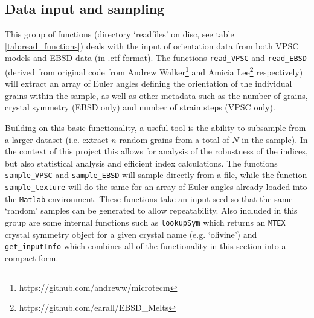 \documentclass[a4paper,12pt,twoside]{report}
\numberwithin{equation}{chapter}
\begin{document}
\subsection{Data input and sampling}

This group of functions (directory \lq{}readfiles\rq{} on disc, see table \ref{tab:read_functions}) deals with the input of orientation data from both VPSC models and EBSD data (in .ctf format). The functions \texttt{read\_{}VPSC} and \texttt{read\_{}EBSD} (derived from original code from  Andrew Walker\footnote{https://github.com/andreww/microtecm} and Amicia Lee\footnote{https://github.com/earall/EBSD\_{}Melts} respectively) will extract an array of Euler angles defining the orientation of the individual grains within the sample, as well as other metadata such as the number of grains, crystal symmetry (EBSD only) and number of strain steps (VPSC only).                                                

Building on this basic functionality, a useful tool is the ability to subsample from a larger dataset (i.e. extract $n$ random grains from a total of $N$ in the sample). In the context of this project this allows for analysis of the robustness of the indices, but also statistical analysis and efficient index calculations. The functions \texttt{sample\_{}VPSC} and \texttt{sample\_{}EBSD} will sample directly from a file, while the function \texttt{sample\_{}texture} will do the same for an array of Euler angles already loaded into the \texttt{Matlab} environment. These functions take an input seed so that the same \lq{}random\rq{} samples can be generated to allow repeatability. Also included in this group are some internal functions such as \texttt{lookupSym} which returns an \texttt{MTEX} crystal symmetry object \citep{Bachmann2010} for a given crystal name (e.g. \lq{}olivine\rq{}) and \texttt{get\_{}inputInfo} which combines all of the functionality in this section into a compact form.                                                                                                                            
\end{document}
